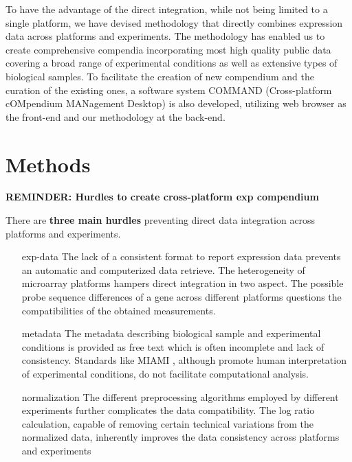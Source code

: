 To have the advantage of the direct integration, while not being limited to a
single platform, we have devised methodology that directly combines expression
data across platforms and experiments.
%
The methodology has enabled us to create comprehensive compendia incorporating
most high quality public data covering a broad range of experimental conditions
as well as extensive types of biological samples.
%
To facilitate the creation of new compendium and the curation of the existing
ones, a software system COMMAND (Cross-platform cOMpendium MANagement Desktop)
is also developed, utilizing web browser as the front-end and our methodology
at the back-end.




\section{Methods}


\textbf{REMINDER: Hurdles to create cross-platform exp compendium}

There are \textbf{three main hurdles} preventing direct data integration across
platforms and experiments.
%
\begin{itemize}
%
\item[exp-data] The lack of a consistent format to report expression data
  prevents an automatic and computerized data retrieve.
%
  The heterogeneity of microarray platforms hampers direct integration in two
  aspect.  The possible probe sequence differences of a gene across different
  platforms questions the compatibilities of the obtained measurements.
%
\item[metadata] The metadata describing biological sample and experimental
  conditions is provided as free text which is often incomplete and lack of
  consistency.  Standards like MIAMI \cite{Brazma2001, Brazma2009}, although
  promote human interpretation of experimental conditions, do not facilitate
  computational analysis.
%
\item[normalization] The different preprocessing algorithms employed by
  different experiments further complicates the data compatibility.
%
  The log ratio calculation, capable of removing certain technical variations
  from the normalized data, inherently improves the data consistency across
  platforms and experiments \cite{Shi2006, Shi2008}
%
\end{itemize}






